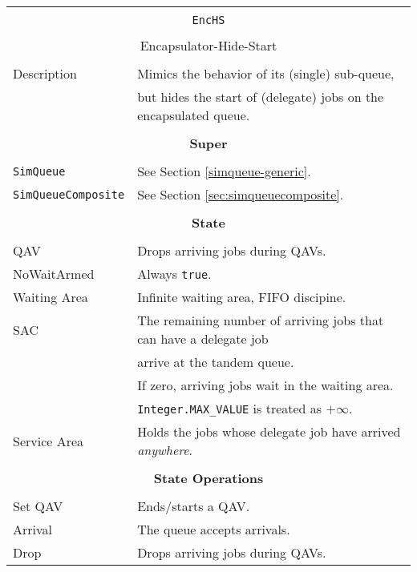 \begin{tabular}{|l|l|}
	\hline
	\multicolumn{2}{|c|}{} \\
	\multicolumn{2}{|c|}{\lstinline[basicstyle=\large]{EncHS}} \\
	\multicolumn{2}{|c|}{} \\
	\multicolumn{2}{|c|}{Encapsulator-Hide-Start} \\
	\multicolumn{2}{|c|}{} \\
	\hline
	Description & Mimics the behavior of its (single) sub-queue, \\
	            & but hides the start of (delegate) jobs on the encapsulated queue.\\
	\hline
	\multicolumn{2}{|c|}{} \\
	\multicolumn{2}{|c|}{\bf Super} \\
	\multicolumn{2}{|c|}{} \\
	\hline
	\lstinline|SimQueue| & See Section \ref{simqueue-generic}. \\
	\lstinline|SimQueueComposite| & See Section \ref{sec:simqueuecomposite}. \\
	\hline
	\multicolumn{2}{|c|}{} \\
	\multicolumn{2}{|c|}{\bf State} \\
	\multicolumn{2}{|c|}{} \\
	\hline
	QAV & Drops arriving jobs during QAVs. \\
	\hline
	NoWaitArmed & Always \lstinline|true|. \\
	\hline
	Waiting Area & Infinite waiting area, FIFO discipine. \\
	\hline
	SAC & The remaining number of arriving jobs that can have a delegate job \\
	& arrive at the tandem queue. \\
	& If zero, arriving jobs wait in the waiting area. \\
	& \lstinline|Integer.MAX_VALUE| is treated as $+\infty$. \\
	\hline
	Service Area & Holds the jobs whose delegate job have arrived {\em anywhere}. \\
	\hline
	\multicolumn{2}{|c|}{} \\
	\multicolumn{2}{|c|}{\bf State Operations} \\
	\multicolumn{2}{|c|}{} \\
	\hline
	Set QAV & Ends/starts a QAV. \\
	\hline
	Arrival & The queue accepts arrivals. \\
	\hline
	Drop & Drops arriving jobs during QAVs. \\

\end{tabular}
